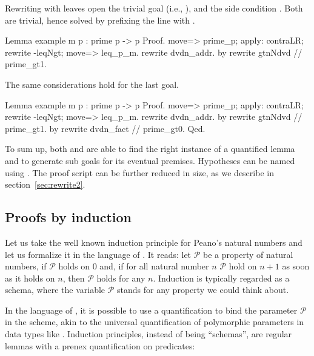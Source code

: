 
Rewriting with
 leaves open the trivial goal  (i.e., ),
and the side condition .  Both are trivial, hence
solved by prefixing the line with .

\begin{coq}{}{}
Lemma example m p : prime p -> p %
Proof.
move=> prime_p; apply: contraLR; rewrite -leqNgt; move=> leq_p_m.
rewrite dvdn_addr.
  by rewrite gtnNdvd // prime_gt1.
\end{coq}
The same considerations hold for the last goal.

\begin{coq}{}{}
Lemma example m p : prime p -> p %
Proof.
move=> prime_p; apply: contraLR; rewrite -leqNgt; move=> leq_p_m.
rewrite dvdn_addr.
  by rewrite gtnNdvd // prime_gt1.
by rewrite dvdn_fact // prime_gt0.
Qed.
\end{coq}

To sum up, both  and  are able to find the right
instance of a quantified lemma and to generate sub goals
for its eventual premises.  Hypotheses can be named using .
The proof script can be further reduced in size, as we describe in
section~\ref{sec:rewrite2}.

\subsection{Proofs by induction}\label{ssec:ind}

Let us take the well known induction principle for Peano's natural numbers
and let us formalize it in the language of \Coq{}.  It reads:
let $\mathcal{P}$ be a property of natural numbers, if
$\mathcal{P}$ holds on $0$ and, if for all natural number $n$
$\mathcal{P}$ hold on $n + 1$ as soon as it holds on $n$, then $\mathcal{P}$
holds for any $n$.  Induction is typically regarded as a schema, where
the variable $\mathcal{P}$ stands for any property we could think about.

In the language of \Coq{}, it is possible to use a quantification to
bind the parameter  $\mathcal{P}$ in the scheme, akin to the universal
quantification of polymorphic parameters in data types like
. Induction principles, instead of being ``schemas'', are
regular lemmas with a prenex quantification on predicates:

